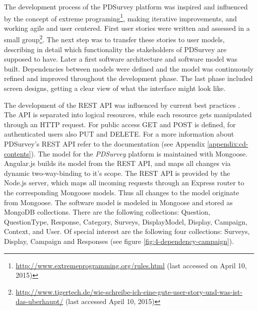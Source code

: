 	The development process of the PDSurvey platform was inspired and influenced by the concept of extreme programing\footnote{\url{http://www.extremeprogramming.org/rules.html} (last accessed on April 10, 2015)}, making iterative improvements, and working agile and user centered. First user stories were written and assessed in a small group\footnote{\url{http://www.tigertech.de/wie-schreibe-ich-eine-gute-user-story-und-was-ist-das-uberhaupt/} (last accessed April 10, 2015)}. The next step was to transfer these stories to user models, describing in detail which functionality the stakeholders of PDSurvey are supposed to have. Later a first software architecture and software model was built. Dependencies between models were defined and the model was continuously refined and improved throughout the development phase. The last phase included screen designs, getting a clear view of what the interface might look like.

	The development of the REST API was influenced by current best practices \cite{Sahni2015RESTAPI, TutsPlus2015RESTAPI, hughes2012einfuhrung}. The API is separated into logical resources, while each resource gets manipulated through an HTTP request. For public access GET and POST is defined, for authenticated users also PUT and DELETE. For a more information about PDSurvey's REST API refer to the documentation (see Appendix \ref{appendix:cd-contents}).
	The model for the \textit{PDSurvey} platform is maintained with Mongoose. Angular.js builds its model from the REST API, and maps all changes via dynamic two-way-binding to it's scope. The REST API is provided by the Node.js server, which maps all incoming requests through an Express router to the corresponding Mongoose models. Thus all changes to the model originate from Mongoose.
	The software model is modeled in Mongoose and stored as MongoDB collections. There are the following collections: Question, QuestionType, Response, Category, Surveys, DisplayModel, Display, Campaign, Context, and User. 
	Of special interest are the following four collections: Surveys, Display, Campaign and Responses (see figure \ref{fig:4-dependency-campaign}).




